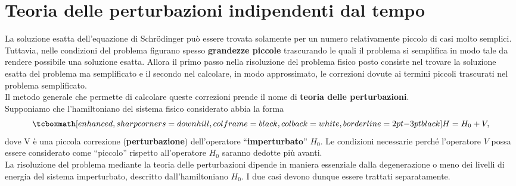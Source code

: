 \chapter[T.d.P. indipendenti dal tempo]{Teoria delle perturbazioni indipendenti dal tempo}
La soluzione esatta dell'equazione di Schr\"{o}dinger può essere trovata solamente per un numero relativamente piccolo di casi molto semplici.\\

Tuttavia, nelle condizioni del problema figurano spesso \textbf{grandezze piccole} trascurando le quali il problema si semplifica in modo tale da rendere possibile una soluzione esatta. Allora il primo passo nella risoluzione del problema fisico posto consiste nel trovare la soluzione esatta del problema ma semplificato e il secondo nel calcolare, in modo approssimato, le correzioni dovute ai termini piccoli trascurati nel problema semplificato.\\

Il metodo generale che permette di calcolare queste correzioni prende il nome di \textbf{teoria delle perturbazioni}.\\

Supponiamo che l'hamiltoniano del sistema fisico considerato abbia la forma
	\begin{equation}
		\tcboxmath[enhanced, sharp corners=downhill, colframe=black, colback=white, borderline={2pt}{-3pt}{black}]{
			H= H_0+ V,
			}
	\end{equation}
dove V è una piccola correzione (\textbf{perturbazione}) dell'operatore ``\textbf{imperturbato}'' $H_0$. Le condizioni necessarie perché l'operatore $V$ possa essere considerato come ``piccolo'' rispetto all'operatore $H_0$ saranno dedotte più avanti.\\

La risoluzione del problema mediante la teoria delle perturbazioni dipende in maniera essenziale dalla degenerazione o meno dei livelli di energia del sistema imperturbato, descritto dall'hamiltoniano $H_0$. I due casi devono dunque essere trattati separatamente.
